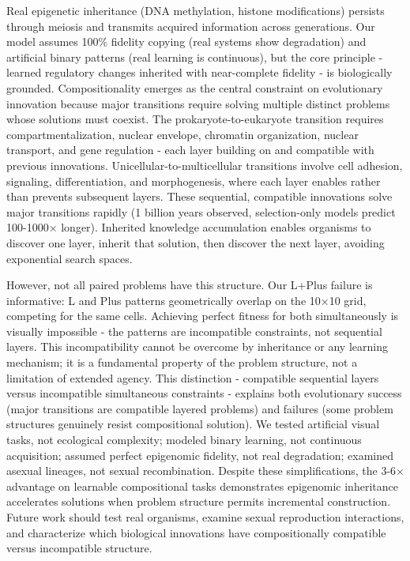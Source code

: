 \documentclass[11pt]{article}
\begin{document}
Real epigenetic inheritance (DNA methylation, histone modifications) persists through meiosis and transmits acquired information across generations\citep{Pembrey2006,WaterlandJirtle2007}. Our model assumes 100\% fidelity copying (real systems show degradation) and artificial binary patterns (real learning is continuous), but the core principle - learned regulatory changes inherited with near-complete fidelity - is biologically grounded. Compositionality emerges as the central constraint on evolutionary innovation because major transitions require solving multiple distinct problems whose solutions must coexist. The prokaryote-to-eukaryote transition requires compartmentalization, nuclear envelope, chromatin organization, nuclear transport, and gene regulation - each layer building on and compatible with previous innovations. Unicellular-to-multicellular transitions involve cell adhesion, signaling, differentiation, and morphogenesis, where each layer enables rather than prevents subsequent layers. These sequential, compatible innovations solve major transitions rapidly (1 billion years observed, selection-only models predict 100-1000× longer). Inherited knowledge accumulation enables organisms to discover one layer, inherit that solution, then discover the next layer, avoiding exponential search spaces.

However, not all paired problems have this structure. Our L+Plus failure is informative: L and Plus patterns geometrically overlap on the 10×10 grid, competing for the same cells. Achieving perfect fitness for both simultaneously is visually impossible - the patterns are incompatible constraints, not sequential layers. This incompatibility cannot be overcome by inheritance or any learning mechanism; it is a fundamental property of the problem structure, not a limitation of extended agency. This distinction - compatible sequential layers versus incompatible simultaneous constraints - explains both evolutionary success (major transitions are compatible layered problems) and failures (some problem structures genuinely resist compositional solution). We tested artificial visual tasks, not ecological complexity; modeled binary learning, not continuous acquisition; assumed perfect epigenomic fidelity, not real degradation; examined asexual lineages, not sexual recombination. Despite these simplifications, the 3-6× advantage on learnable compositional tasks demonstrates epigenomic inheritance accelerates solutions when problem structure permits incremental construction. Future work should test real organisms, examine sexual reproduction interactions, and characterize which biological innovations have compositionally compatible versus incompatible structure.
\end{document}
